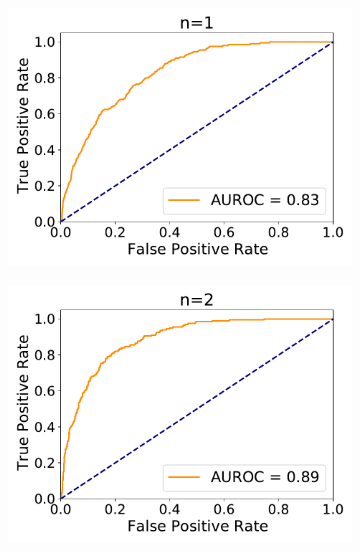 \begin{figure}[H]
	\begin{subfigure}{.33\textwidth}
		\centering
		\includegraphics[width=1\linewidth]{figures/roc_analysis/roc_exactUpdate/AUROC_2000samples_class0_llh_n1}
		\caption{}
		\label{fig:roc_exact_n1}
	\end{subfigure}%
	\begin{subfigure}{.33\textwidth}
		\centering
		\includegraphics[width=1\linewidth]{figures/roc_analysis/roc_exactUpdate/AUROC_2000samples_class0_llh_n2}
		\caption{}
		\label{fig:roc_exact_n2}
	\end{subfigure}
	\begin{subfigure}{.33\textwidth}
		\centering

\end{subfigure}
\end{figure}
